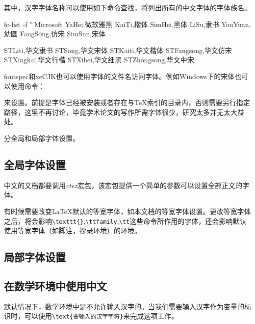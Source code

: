 其中，汉字字体名称可以使用如下命令查找，将列出所有的中文字体的字体族名。

\begin{latex}
fc-list -f "%
Microsoft YaHei,微软雅黑
KaiTi,楷体
SimHei,黑体
LiSu,隶书
YouYuan,幼圆
FangSong,仿宋
SimSun,宋体

STLiti,华文隶书
STSong,华文宋体
STKaiti,华文楷体
STFangsong,华文仿宋
STXingkai,华文行楷
STXihei,华文细黑
STZhongsong,华文中宋
\end{latex}

fontspec和xeCJK也可以使用字体的文件名访问字体。例如Windows下的宋体也可以使用命令：
\begin{latex}
\end{latex}
来设置。前提是字体已经被安装或者存在与\TeX 索引的目录内，否则需要另行指定路径，这里不再讨论，毕竟学术论文的写作所需字体很少，研究太多并无太大益处。

分全局和局部字体设置。
\subsection{全局字体设置}
中文的文档都要调用\emph{ctex}宏包，该宏包提供一个简单的参数可以设置全部正文的字体。

\begin{latex}
\setmainfont{Times New Roman}    %
\end{latex}

有时候需要改变\LaTeX 默认的等宽字体，如本文档的等宽字体设置。更改等宽字体之后，将会影响\lstinline|\texttt{}|,\lstinline|\ttfamily|,\lstinline|\tt|这些命令所作用的字体，还会影响默认使用等宽字体（如脚注，抄录环境）的环境。

\begin{latex}
\setmonofont{Source Code Pro}    %
\end{latex}

\subsection{局部字体设置}

\begin{latex}
\newfontfamily{}    %
\end{latex}

\subsection{在数学环境中使用中文}
默认情况下，数学环境中是不允许输入汉字的。当我们需要输入汉字作为变量的标识时，可以使用\lstinline|\text{要输入的汉字字符}|来完成这项工作。

